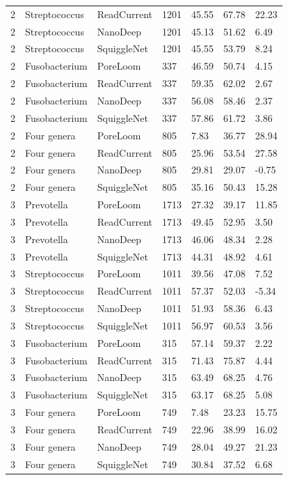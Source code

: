 \begin{longtable}{lllllll}
2 & Streptococcus & ReadCurrent & 1201 & 45.55 & 67.78 & 22.23\\
2 & Streptococcus & NanoDeep & 1201 & 45.13 & 51.62 & 6.49\\
2 & Streptococcus & SquiggleNet & 1201 & 45.55 & 53.79 & 8.24\\
2 & Fusobacterium & PoreLoom & 337 & 46.59 & 50.74 & 4.15\\
2 & Fusobacterium & ReadCurrent & 337 & 59.35 & 62.02 & 2.67\\
2 & Fusobacterium & NanoDeep & 337 & 56.08 & 58.46 & 2.37\\
2 & Fusobacterium & SquiggleNet & 337 & 57.86 & 61.72 & 3.86\\
2 & Four genera & PoreLoom & 805 & 7.83 & 36.77 & 28.94\\
2 & Four genera & ReadCurrent & 805 & 25.96 & 53.54 & 27.58\\
2 & Four genera & NanoDeep & 805 & 29.81 & 29.07 & -0.75\\
2 & Four genera & SquiggleNet & 805 & 35.16 & 50.43 & 15.28\\
3 & Prevotella & PoreLoom & 1713 & 27.32 & 39.17 & 11.85\\
3 & Prevotella & ReadCurrent & 1713 & 49.45 & 52.95 & 3.50\\
3 & Prevotella & NanoDeep & 1713 & 46.06 & 48.34 & 2.28\\
3 & Prevotella & SquiggleNet & 1713 & 44.31 & 48.92 & 4.61\\
3 & Streptococcus & PoreLoom & 1011 & 39.56 & 47.08 & 7.52\\
3 & Streptococcus & ReadCurrent & 1011 & 57.37 & 52.03 & -5.34\\
3 & Streptococcus & NanoDeep & 1011 & 51.93 & 58.36 & 6.43\\
3 & Streptococcus & SquiggleNet & 1011 & 56.97 & 60.53 & 3.56\\
3 & Fusobacterium & PoreLoom & 315 & 57.14 & 59.37 & 2.22\\
3 & Fusobacterium & ReadCurrent & 315 & 71.43 & 75.87 & 4.44\\
3 & Fusobacterium & NanoDeep & 315 & 63.49 & 68.25 & 4.76\\
3 & Fusobacterium & SquiggleNet & 315 & 63.17 & 68.25 & 5.08\\
3 & Four genera & PoreLoom & 749 & 7.48 & 23.23 & 15.75\\
3 & Four genera & ReadCurrent & 749 & 22.96 & 38.99 & 16.02\\
3 & Four genera & NanoDeep & 749 & 28.04 & 49.27 & 21.23\\
3 & Four genera & SquiggleNet & 749 & 30.84 & 37.52 & 6.68\\
\end{longtable}
